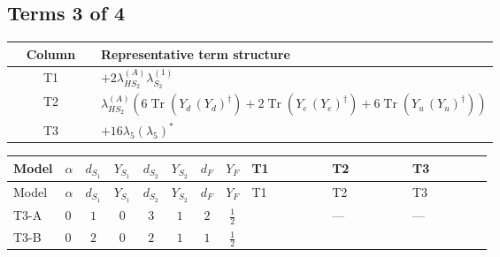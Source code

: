\documentclass[8pt]{article}
\begin{document}
\begin{landscape}
\subsection*{Terms 3 of 4}
\begin{center}
\begin{tabular}{@{}c >{\raggedright\arraybackslash}p{0.82\linewidth}@{}}
\toprule
Column & Representative term structure \\
\midrule
T1 & \(\displaystyle +2 {\lambda_{HS_2}^{(A)}} {\lambda_{S_2}^{(1)}}\) \\
\midrule
T2 & \(\displaystyle {\lambda_{HS_2}^{(A)}} (6 \operatorname{Tr}\!\left({Y_d}\,\left({Y_d}\right)^{\dagger}\right)+2 \operatorname{Tr}\!\left({Y_e}\,\left({Y_e}\right)^{\dagger}\right)+6 \operatorname{Tr}\!\left({Y_u}\,\left({Y_u}\right)^{\dagger}\right))\) \\
\midrule
T3 & \(\displaystyle +16 {\lambda_5} \left({\lambda_5}\right)^{*}\) \\
\midrule
\bottomrule
\end{tabular}
\end{center}
\smallskip
\tiny
\begin{longtable}{@{}llcccccc >{\raggedright\arraybackslash}p{0.21\linewidth} >{\raggedright\arraybackslash}p{0.21\linewidth} >{\raggedright\arraybackslash}p{0.21\linewidth}@{}}
\toprule
Model & $\alpha$ & $d_{S_1}$ & $Y_{S_1}$ & $d_{S_2}$ & $Y_{S_2}$ & $d_F$ & $Y_F$ & T1 & T2 & T3 \\
\midrule
\endfirsthead
\toprule
Model & $\alpha$ & $d_{S_1}$ & $Y_{S_1}$ & $d_{S_2}$ & $Y_{S_2}$ & $d_F$ & $Y_F$ & T1 & T2 & T3 \\
\midrule
\endhead
T3-A & $0$ & $1$ & $0$ & $3$ & $1$ & $2$ & $\frac{1}{2}$ & \scriptsize\adjustbox{max width=\linewidth}{$\begin{gathered} +2 {\lambda_{HS_2}^{(A)}} {\lambda_{S_2}^{(1)}}\end{gathered}$} & --- & --- \\
\midrule
T3-B & $0$ & $2$ & $0$ & $2$ & $1$ & $1$ & $\frac{1}{2}$ & \scriptsize\adjustbox{max width=\linewidth}{$\begin{gathered} +2 {\lambda_{HS_2}^{(A)}} {\lambda_{S_2}^{(1)}}\end{gathered}$} & \scriptsize\adjustbox{max width=\linewidth}{$\begin{gathered} {\lambda_{HS_2}^{(A)}} (6 \operatorname{Tr}\!\left({Y_d}\,\left({Y_d}\right)^{\dagger}\right)+2 \operatorname{Tr}\!\left({Y_e}\,\left({Y_e}\right)^{\dagger}\right)+6 \operatorname{Tr}\!\left({Y_u}\,\left({Y_u}\right)^{\dagger}\right))\end{gathered}$} & \scriptsize\adjustbox{max width=\linewidth}{$\begin{gathered} +16 {\lambda_5} \left({\lambda_5}\right)^{*}\end{gathered}$} \\

\end{longtable}
\end{landscape}
\end{document}
